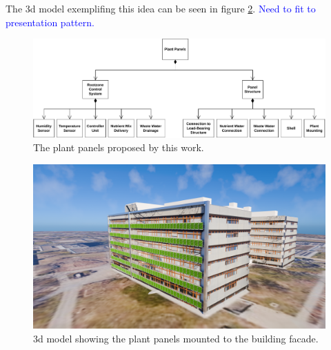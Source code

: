The 3d model exemplifing this idea can be seen in figure \ref{fig:3d-panels}.
\textcolor{Blue}{Need to fit to presentation pattern.}
\begin{figure}[htbp]
  \centering
  \caption{The plant panels proposed by this work.}
  \label{fig:panels}
  \includegraphics[width=\textwidth]{img/architecture/panels.pdf}
\end{figure}

\begin{figure}[htbp]
  \centering
  \caption{3d model showing the plant panels mounted to the building facade.}
  \label{fig:3d-panels}
  \includegraphics[width=\textwidth]{img/3d_model/3d-3-panels.png}
\end{figure}

